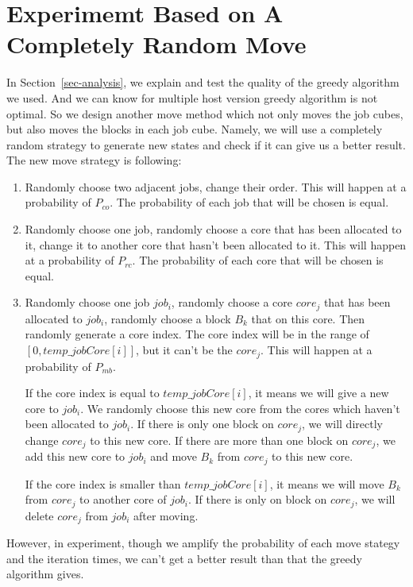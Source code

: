 \documentclass{llncs}
\begin{document}
	\section{Experimemt Based on A Completely Random Move} \label{random}
	In Section~\ref{sec-analysis}, we explain and test the quality of the greedy algorithm we used. And we can know for multiple host version greedy algorithm is not optimal. So we design another move method which not only moves the job cubes, but also moves the blocks in each job cube. Namely, we will use a completely random strategy to generate new states and check if it can give us a better result. 
	The new move strategy is following:
	\begin{enumerate}
		\item Randomly choose two adjacent jobs, change their order. This will happen at a probability of $P_{co}$. The probability of each job that will be chosen is equal. 
		\item Randomly choose one job, randomly choose a core that has been allocated to it, change it to another core that hasn't been allocated to it. This will happen at a probability of $P_{rc}$. The probability of each core that will be chosen is equal. 
		\item Randomly choose one job $job_i$, randomly choose a core $core_j$ that has been allocated to $job_i$, randomly choose a block $B_k$ that on this core. Then randomly generate a core index. The core index will be in the range of $[0, temp\_jobCore[i]]$, but it can't be the $core_j$. This will happen at a probability of $P_{mb}$. 
		
		\par If the core index is equal to $temp\_jobCore[i]$, it means we will give a new core to $job_i$. We randomly choose this new core from the cores which haven't been allocated to $job_i$. If there is only one block on $core_j$, we will directly change $core_j$ to this new core. If there are more than one block on $core_j$, we add this new core to $job_i$ and move $B_k$ from $core_j$ to this new core. 
		\par If the core index is smaller than $temp\_jobCore[i]$, it means we will move $B_k$ from $core_j$ to another core of $job_i$. If there is only on block on $core_j$, we will delete $core_j$ from $job_i$ after moving. 
	\end{enumerate}

	However, in experiment, though we amplify the probability of each move stategy and the iteration times, we can't get a better result than that the greedy algorithm gives. 
	
\end{document}
